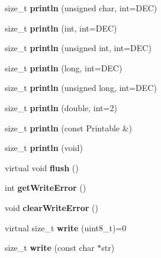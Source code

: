 \begin{DoxyCompactItemize}
size\+\_\+t {\bfseries println} (unsigned char, int=D\+EC)
\item 
\mbox{\label{class_print_a738c88471cfb8eac7c8a804699971413}} 
size\+\_\+t {\bfseries println} (int, int=D\+EC)
\item 
\mbox{\label{class_print_ac87eed1fcb78641169ba2244278c899e}} 
size\+\_\+t {\bfseries println} (unsigned int, int=D\+EC)
\item 
\mbox{\label{class_print_a833fbec3ceba92e3ec95f51e026e4569}} 
size\+\_\+t {\bfseries println} (long, int=D\+EC)
\item 
\mbox{\label{class_print_aebee3c33ee5d8f10b6f378d5273742d0}} 
size\+\_\+t {\bfseries println} (unsigned long, int=D\+EC)
\item 
\mbox{\label{class_print_a56e976b079361b6021ef7c2bedb397a2}} 
size\+\_\+t {\bfseries println} (double, int=2)
\item 
\mbox{\label{class_print_a20f9e104153b62e720c9b4c348b44f00}} 
size\+\_\+t {\bfseries println} (const Printable \&)
\item 
\mbox{\label{class_print_a169b128f9e22f0c15883768f580541a2}} 
size\+\_\+t {\bfseries println} (void)
\item 
\mbox{\label{class_print_add7f8450dfdc7f94eeec685f220573f7}} 
virtual void {\bfseries flush} ()
\item 
\mbox{\label{class_print_a88a4a829fb5d589efb43955ad0cbddcc}} 
int {\bfseries get\+Write\+Error} ()
\item 
\mbox{\label{class_print_aec9ecf84cc6d9087a650def3cefc459e}} 
void {\bfseries clear\+Write\+Error} ()
\item 
\mbox{\label{class_print_a5be30d49adae2406a270c29ba9a3e0a3}} 
virtual size\+\_\+t {\bfseries write} (uint8\+\_\+t)=0
\item 
\mbox{\label{class_print_a5b40e0e9cab1f2fe5bb0cb22ffe5adda}} 
size\+\_\+t {\bfseries write} (const char $\ast$str)

\end{DoxyCompactItemize}
